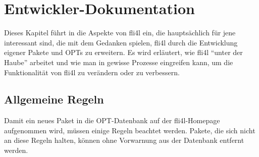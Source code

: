 \chapter{Entwickler-Dokumentation}

Dieses Kapitel führt in die Aspekte von fli4l ein, die hauptsächlich für jene
interessant sind, die mit dem Gedanken spielen, fli4l durch die Entwicklung
eigener Pakete und OPTs zu erweitern. Es wird erläutert, wie fli4l "`unter der
Haube"' arbeitet und wie man in gewisse Prozesse eingreifen kann, um die
Funktionalität von fli4l zu verändern oder zu verbessern.

\section{Allgemeine Regeln}

Damit ein neues Paket in die OPT-Datenbank auf der fli4l-Homepage
aufgenommen wird, müssen einige Regeln beachtet werden. Pakete, die
sich nicht an diese Regeln halten, können ohne Vorwarnung aus der
Datenbank entfernt werden.

